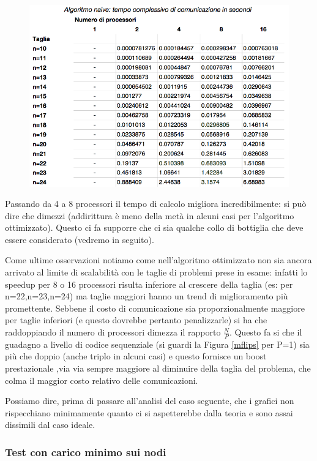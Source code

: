 \documentclass[12pt,a4paper,oneside,openright]{article}
\begin{document}
\begin{figure}[H] 
  \centering
      \includegraphics[width=\textwidth]{immagini/algoritmo_normale_tempo_comunicazione_senza_rete}
\end{figure}

Passando da 4 a  8 processori il tempo di calcolo migliora incredibilmente:  si può dire che dimezzi (addirittura è meno della metà in alcuni casi per l'algoritmo ottimizzato). Questo ci fa supporre che ci sia qualche collo di bottiglia che deve essere considerato (vedremo in seguito).

Come ultime osservazioni notiamo come nell'algoritmo ottimizzato non sia ancora arrivato al limite di scalabilità con le taglie di problemi prese in esame: infatti lo speedup per 8 o 16 processori risulta inferiore al crescere della taglia (es:  per n=22,n=23,n=24) ma taglie maggiori hanno un trend di miglioramento più promettente. Sebbene il costo di comunicazione sia proporzionalmente maggiore per taglie inferiori (e questo dovrebbe pertanto penalizzarle) si ha che raddoppiando il numero di processori dimezza il rapporto $\frac{N}{P}$. Questo fa si che il guadagno a livello di codice sequenziale (si guardi la Figura \ref{mflips} per P=1) sia più che doppio (anche triplo in alcuni casi) e questo fornisce un boost prestazionale ,via via sempre maggiore al diminuire della taglia del problema, che colma il maggior costo relativo delle comunicazioni.

Possiamo dire, prima di passare all'analisi del caso seguente, che i grafici non rispecchiano minimamente quanto ci si aspetterebbe dalla teoria e sono assai dissimili dal caso ideale.

\subsubsection{Test con carico minimo sui nodi}
\end{document}
